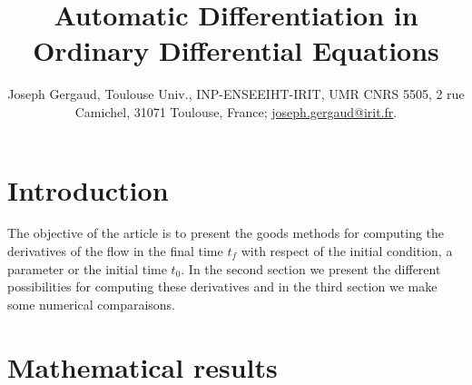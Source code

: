 \documentclass[a4paper,10pt]{article}
\title{Automatic Differentiation in Ordinary Differential Equations} %
\author{Joseph Gergaud, Toulouse Univ., INP-ENSEEIHT-IRIT, UMR CNRS 5505, 2 rue Camichel, 31071 Toulouse, France;
\href{mailto:joseph.gergaud@irit.fr}{joseph.gergaud@irit.fr}.}
\begin{document}
\maketitle


%
\begin{abstract}

\end{abstract}
%
%

\section{Introduction}

The objective of the article is to present the goods methods for computing the derivatives of the flow in the final time $t_f$ with respect of the initial condition, a parameter or the initial time $t_0$. In the second section we present the different possibilities for computing these derivatives and in the third section we make some numerical comparaisons.

\section{Mathematical results}
\end{document}
